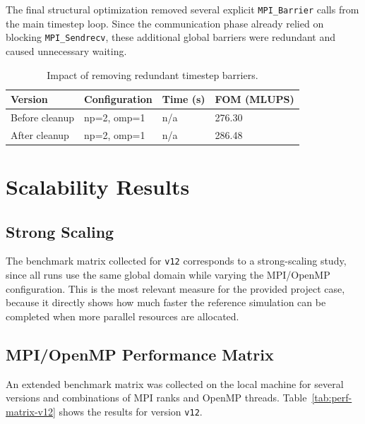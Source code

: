 \documentclass[11pt,a4paper]{article}
\begin{document}
The final structural optimization removed several explicit \texttt{MPI\_Barrier} calls from the main timestep loop. Since the communication phase already relied on blocking \texttt{MPI\_Sendrecv}, these additional global barriers were redundant and caused unnecessary waiting.

\begin{table}[H]
  \centering
  \caption{Impact of removing redundant timestep barriers.}
  \label{tab:barrier-cleanup-results}
  \begin{tabular}{@{}llll@{}}
    \toprule
    Version & Configuration & Time (s) & FOM (MLUPS) \\
    \midrule
    Before cleanup & np=2, omp=1 & n/a & 276.30 \\
    After cleanup & np=2, omp=1 & n/a & 286.48 \\
    \bottomrule
  \end{tabular}
\end{table}

\section{Scalability Results}

\subsection{Strong Scaling}

The benchmark matrix collected for \texttt{v12} corresponds to a strong-scaling study, since all runs use the same global domain while varying the MPI/OpenMP configuration. This is the most relevant measure for the provided project case, because it directly shows how much faster the reference simulation can be completed when more parallel resources are allocated.

\subsection{MPI/OpenMP Performance Matrix}

An extended benchmark matrix was collected on the local machine for several versions and combinations of MPI ranks and OpenMP threads. Table~\ref{tab:perf-matrix-v12} shows the results for version \texttt{v12}.

\begin{table}[H]
  \centering
  \caption{Performance matrix for version \texttt{v12}.}
  \label{tab:perf-matrix-v12}
  
\end{table}
\end{document}
